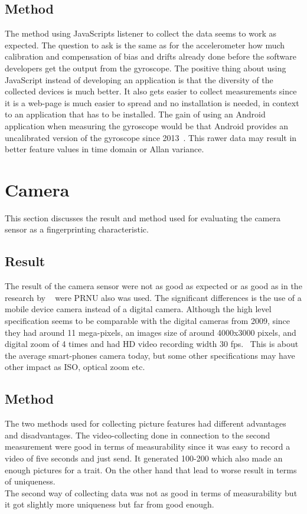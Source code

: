 \subsection{Method}
The method using JavaScripts listener to collect the data seems to work as expected. The question to ask is the same as for the accelerometer how much calibration and compensation of bias and drifts already done before the software developers get the output from the gyroscope. The positive thing about using JavaScript instead of developing an application is that the diversity of the collected devices is much better. It also gets easier to collect measurements since it is a web-page is much easier to spread and no installation is needed, in context to an application that has to be installed. The gain of using an Android application when measuring the gyroscope would be that Android provides an uncalibrated version of the gyroscope since 2013~\cite{android:API18}. This rawer data may result in better feature values in time domain or Allan variance.


\section{Camera}
This section discusses the result and method used for evaluating the camera sensor as a fingerprinting characteristic.
\subsection{Result}
The result of the camera sensor were not as good as expected or as good as in the research by ~\cite[]{sensor:camera:DCIdent} were PRNU also was used. The significant differences is the use of a mobile device camera instead of a digital camera. Although the high level specification seems to be comparable with the digital cameras from 2009, since they had around 11 mega-pixels, an images size of around 4000x3000 pixels, and digital zoom of 4 times and had HD video recording width 30 fps.~\cite[]{gbg:kamera} This is about the average smart-phones camera today, but some other specifications may have other impact as ISO, optical zoom etc.

\subsection{Method}
The two methods used for collecting picture features had different advantages and disadvantages. The video-collecting done in connection to the second measurement were good in terms of measurability since it was easy to record a video of five seconds and just send. It generated 100-200 which also made an enough pictures for a trait. On the other hand that lead to worse result in terms of uniqueness. \\
The second way of collecting data was not as good in terms of measurability but it got slightly more uniqueness but far from good enough.


